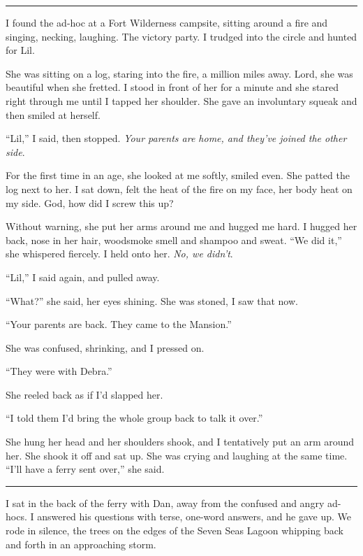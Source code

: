 \begin{center}\rule{3in}{0.4pt}\end{center}

I found the ad-hoc at a Fort Wilderness campsite, sitting around a
fire and singing, necking, laughing. The victory party. I trudged
into the circle and hunted for Lil.

She was sitting on a log, staring into the fire, a million miles
away. Lord, she was beautiful when she fretted. I stood in front of
her for a minute and she stared right through me until I tapped her
shoulder. She gave an involuntary squeak and then smiled at
herself.

“Lil,” I said, then stopped.
\emph{Your parents are home, and they've joined the other side}.

For the first time in an age, she looked at me softly, smiled even.
She patted the log next to her. I sat down, felt the heat of the
fire on my face, her body heat on my side. God, how did I screw
this up?

Without warning, she put her arms around me and hugged me hard. I
hugged her back, nose in her hair, woodsmoke smell and shampoo and
sweat. “We did it,” she whispered fiercely. I held onto her.
\emph{No, we didn't}.

“Lil,” I said again, and pulled away.

“What?” she said, her eyes shining. She was stoned, I saw that
now.

“Your parents are back. They came to the Mansion.”

She was confused, shrinking, and I pressed on.

“They were with Debra.”

She reeled back as if I'd slapped her.

“I told them I'd bring the whole group back to talk it over.”

She hung her head and her shoulders shook, and I tentatively put an
arm around her. She shook it off and sat up. She was crying and
laughing at the same time. “I'll have a ferry sent over,” she
said.

\begin{center}\rule{3in}{0.4pt}\end{center}

I sat in the back of the ferry with Dan, away from the confused and
angry ad-hocs. I answered his questions with terse, one-word
answers, and he gave up. We rode in silence, the trees on the edges
of the Seven Seas Lagoon whipping back and forth in an approaching
storm.

